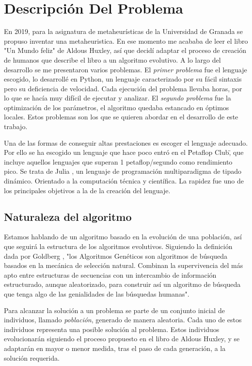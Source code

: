 \chapter{Descripción Del Problema}

En 2019, para la asignatura de metaheurísticas de la Universidad de Granada \cite{merelo molina_2021} se propuso inventar una metaheuristica. En
ese momento me acababa de leer el libro "Un Mundo feliz" de Aldous Huxley, así que decidí adaptar el proceso de creación 
de humanos que describe el libro a un algoritmo evolutivo. A lo largo del desarrollo se me presentaron varios problemas. El
\textit{primer problema} fue el lenguaje escogido, lo desarrollé en Python, un lenguaje caracterizado por su fácil sintaxis pero su deficiencia de
velocidad. Cada ejecución del problema llevaba horas, por lo que se hacía muy difícil de ejecutar y analizar. El
\textit{segundo problema} fue la optimización de los parámetros, el algoritmo quedaba estancado en óptimos locales. Estos problemas son 
los que se quieren abordar en el desarrollo de este trabajo.

Una de las formas de conseguir altas prestaciones es escoger el lenguaje adecuado. Por ello se ha escogido un lenguaje que
hace poco entró en el \"Petaflop Club\", que incluye aquellos lenguajes que superan 1 petaflop/segundo como rendimiento pico. Se trata
de Julia \cite{julia}, un lenguaje de programación multiparadigma de tipado dinámico. Orientado a la computación técnica y 
científica. La rapidez fue uno de los principales objetivos a la de la creación del lenguaje. 

\section{Naturaleza del algoritmo}

Estamos hablando de un algoritmo basado en la evolución de una población, así que seguirá la estructura de los
algoritmos evolutivos. Siguiendo la definición dada por Goldberg \cite{goldberg89}, "los Algoritmos Genéticos son algoritmos de búsqueda
basados en la mecánica de selección natural. Combinan la supervivencia del más apto entre estructuras de secuencias con un intercambio de 
información estructurado, aunque aleatorizado, para construir así un algoritmo
de búsqueda que tenga algo de las genialidades de las búsquedas humanas".

Para alcanzar la solución a un problema se parte de un conjunto inicial de individuos, llamado \textit{población},
generado de manera aleatoria. Cada uno de estos individuos representa una posible solución al problema. Estos individuos
evolucionarán siguiendo el proceso propuesto en el libro de Aldous Huxley, y se adaptarán en mayor o menor medida,
tras el paso de cada generación, a la solución requerida.

